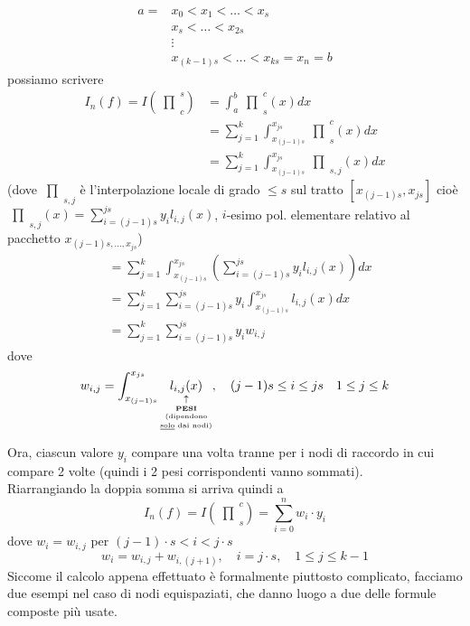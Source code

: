 \documentclass[12pt,a4paper]{article}
\newcommand{\inter}{\begin{matrix}\prod\end{matrix}}
\begin{document}
\begin{equation*}
    \begin{split}
        a = & x_0 < x_1 < \dotso < x_s \\
        & x_s < \dotso < x_ {2s} \\
        & \vdots \\
        & x_{(k-1)s} < \dotso < x_{ks} = x_n = b
    \end{split}
\end{equation*}
possiamo scrivere
\begin{equation*}
    \begin{split}
        I_n(f) = I(\inter_c^s) & = \int_a^b \inter_s^c(x) dx \\
        & = \sum_{j=1}^k \int_{x_{(j-1)s}}^{x_{js}} \inter_s^c(x) dx \\
        & = \sum_{j=1}^k \int_{x_{(j-1)s}}^{x_{js}} \inter_{s,j}(x) dx
    \end{split}
\end{equation*}
(dove $\inter_{s,j}$ è l'interpolazione locale di grado $\leq s$ sul tratto $[x_{(j-1)s},x_{js}]$ cioè $\inter_{s,j}(x)=\sum_{i=(j-1)s}^{js} y_i l_{i,j} (x)$, $i$-esimo pol. elementare relativo al pacchetto $x_{(j-1)s, \dotso , x_{js}}$)
\begin{equation*}
    \begin{split}
        & = \sum_{j=1}^k \int_{x_{(j-1)s}}^{x_{js}} \left(\sum_{i=(j-1)s}^{js} y_i l_{i,j}(x) \right) dx \\ 
        & = \sum_{j=1}^k \sum_{i=(j-1)s}^{js} y_i \int_{x_{(j-1)s}}^{x_{js}} l_{i,j}(x)dx \\
        & = \sum_{j=1}^k \sum_{i=(j-1)s}^{js} y_i w_{i,j}
    \end{split}
\end{equation*}
dove 
\[w_{i,j} = \int_{x_{(j-1)s}}^{x_{js}} \underset{\underset{\underset{\underset{\text{\underline{solo} dai nodi)}}{\text{(dipendono}}}{\textbf{PESI}}}{\uparrow}}{l_{i,j}(x)} , \quad (j-1)s \leq i \leq js \quad  1 \leq j \leq k\]
Ora, ciascun valore $y_i$ compare una volta tranne per i nodi di raccordo in cui compare 2 volte (quindi i 2 pesi corrispondenti vanno sommati).\\
Riarrangiando la doppia somma si arriva quindi a
\[
I_n (f) = I(\inter_s^c) = \sum_{i=0}^n w_i \cdot y_i
\]
dove $w_i = w_{i,j}$ per $(j-1) \cdot s < i < j \cdot s$
\[
w_i = w_{i,j} + w_{i,(j+1)}, \quad i=j \cdot s, \quad 1 \leq j \leq k-1
\]
Siccome il calcolo appena effettuato è formalmente piuttosto complicato, facciamo due esempi nel caso di nodi equispaziati, che danno luogo a due delle formule composte più usate.
\end{document}
